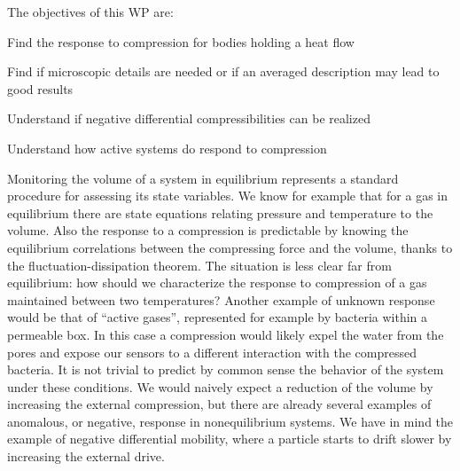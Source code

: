 \begin{workpackage}[id=WP2ID,wphases=0-48,
  short=Nonequilibrium compressibility, %
  title=Nonequilibrium compressibility, %
  lead=Padova,
  PadovaRM=12,
  Padova22RM=6,
  Padova3RM=24]

\begin{wpobjectives}
  The objectives of this WP are:
  \begin{compactitem}
  \item Find the response to compression for bodies holding a heat flow
  \item Find if microscopic details are needed or if an averaged description may lead to good results
  \item Understand if negative differential compressibilities can be realized
  \item Understand how active systems do respond to compression
  \end{compactitem}
\end{wpobjectives}

\begin{wpdescription}
Monitoring the volume of a system in equilibrium represents a standard procedure for assessing its state variables.
We know for example that for a gas in equilibrium there are state equations relating pressure and temperature to
the volume. Also the response to a compression is predictable by knowing the equilibrium correlations between the
compressing force and the volume, thanks to the fluctuation-dissipation theorem. The situation is less clear far
from equilibrium: how should we characterize the response to compression of a gas maintained between two temperatures?
Another example of unknown response would be that of ``active gases'', represented for example by bacteria within
a permeable box. In this case a compression would likely expel the water from the pores and expose our sensors
to a different interaction with the compressed bacteria. It is not trivial to predict by common sense the behavior 
of the system under these conditions. We would naively expect a reduction of the volume by increasing the external
compression, but there are already several examples of anomalous, or negative, response in nonequilibrium systems.
We have in mind the example of negative differential mobility, where a particle starts to drift slower by increasing
the external drive.


\end{wpdescription}
\end{workpackage}
